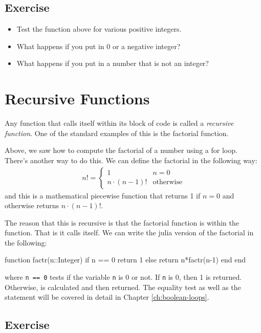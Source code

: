 \subsection{Exercise}

\begin{itemize}
\item Test the function above for various positive integers.
\item What happens if you put in 0 or a negative integer?
\item What happens if you put in a number that is not an integer?
\end{itemize}


\section{Recursive Functions}\label{sect:recursion}

Any function that calls itself within its block of code is called a
\emph{recursive function}. One of the standard examples of this is the
factorial function.

Above, we saw how to compute the factorial of a number using a for loop.
There's another way to do this. We can define the factorial in the
following way:
\begin{align*}
  n!=
  \begin{cases}
    1 & n=0 \\
    n\cdot(n-1)! & \text{otherwise}
  \end{cases}
\end{align*}
and this is a mathematical piecewise function that returns 1 if $n=0$ and otherwise returns $n\cdot(n-1)!$.  

The reason that this is recursive is that the factorial function is within the function.  That is it calls itself.  We can write the julia version of the factorial in the following: 
%
\begin{jlblock}[functions]
function factr(n::Integer)
  if n == 0
    return 1
  else
    return n*factr(n-1)
  end
end
\end{jlblock}
%
where \texttt{n\ ==\ 0} tests if the variable \texttt{n} is 0 or not.  If \texttt{n} is 0, then 1 is returned.  Otherwise,  is calculated and then returned.  The equality test as well as the  statement will be covered in detail in Chapter \ref{ch:boolean-loops}. 


\subsection{Exercise}

